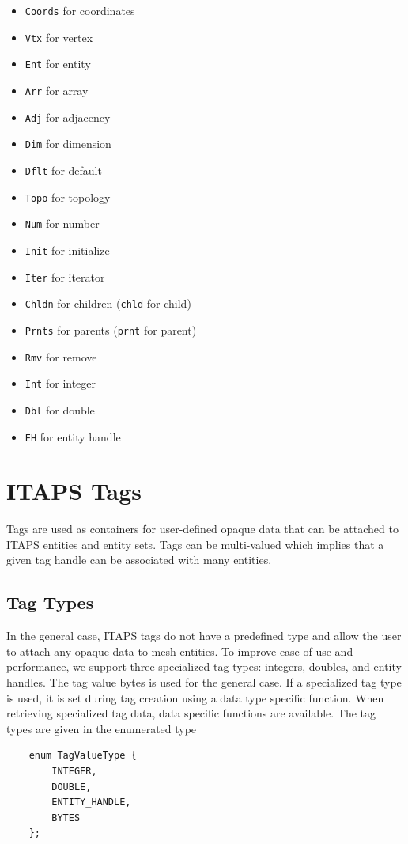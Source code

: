\documentclass{article}
\begin{document}
\begin{itemize}
\item {\tt Coords} for coordinates
\item {\tt Vtx} for vertex
\item {\tt Ent} for entity
\item {\tt Arr} for array
\item {\tt Adj} for adjacency
\item {\tt Dim} for dimension
\item {\tt Dflt} for default
\item {\tt Topo} for topology
\item {\tt Num} for number
\item {\tt Init} for initialize
\item {\tt Iter} for iterator
\item {\tt Chldn} for children ({\tt chld} for child)
\item {\tt Prnts} for parents ({\tt prnt} for parent)
\item {\tt Rmv} for remove
\item {\tt Int} for integer
\item {\tt Dbl} for double
\item {\tt EH} for entity handle
\end{itemize}

\section{ITAPS Tags}

Tags are used as containers for user-defined opaque data that 
can be attached to ITAPS entities and entity sets. Tags can be 
multi-valued which implies that a given tag handle can be associated 
with many entities.

\subsection{Tag Types}
In the general case, ITAPS tags do not have a predefined type 
and allow the user to attach any opaque data to mesh entities. 
To improve ease of use and performance, we support three specialized 
tag types: integers, doubles, and entity handles. The tag value 
bytes is used for the general case. If a specialized tag type 
is used, it is set during tag creation using a data type specific 
function. When retrieving specialized tag data, data specific 
functions are available. The tag types are given in the enumerated 
type
\begin{verbatim}
    enum TagValueType { 
        INTEGER, 
        DOUBLE, 
        ENTITY_HANDLE, 
        BYTES 
    };
\end{verbatim}
\end{document}
